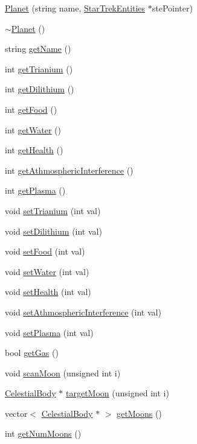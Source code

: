 \begin{DoxyCompactItemize}
\item 
\hyperlink{classPlanet_ac5a904c9d24bd4244ad72bb7ae3689f8}{Planet} (string name, \hyperlink{classStarTrekEntities}{StarTrekEntities} $\ast$stePointer)
\item 
\hyperlink{classPlanet_aaa1aaed9d4ef90b4836531edb7b18e0a}{$\sim$Planet} ()
\item 
string \hyperlink{classPlanet_a645b3d987a3001bac59a772b944607d2}{getName} ()
\item 
int \hyperlink{classPlanet_a37f64a787c17b5dd4471c8ad54fd9df0}{getTrianium} ()
\item 
int \hyperlink{classPlanet_a272240452921331e7220108df452a37d}{getDilithium} ()
\item 
int \hyperlink{classPlanet_a2b85fd628db9831d7ab5c7149b80cde3}{getFood} ()
\item 
int \hyperlink{classPlanet_af5bc4d184fcb72bd37f70119af5ecd89}{getWater} ()
\item 
int \hyperlink{classPlanet_a4499676225d09b0249cf225e795ce3cb}{getHealth} ()
\item 
int \hyperlink{classPlanet_a802c105bafd608a0ac57e8f03d2d2465}{getAthmosphericInterference} ()
\item 
int \hyperlink{classPlanet_ad7c07f51f9a447bf4aba45875e5f8e44}{getPlasma} ()
\item 
void \hyperlink{classPlanet_a298ae0e6344b5e83b4c53e5377b0531f}{setTrianium} (int val)
\item 
void \hyperlink{classPlanet_a780868e3c6275c2f8026bf7f7b910be1}{setDilithium} (int val)
\item 
void \hyperlink{classPlanet_a2f73c4ce9e4e4eb204b50413ea81d0cc}{setFood} (int val)
\item 
void \hyperlink{classPlanet_afbc0d813ae0d2a958487cfc2a06fd9d1}{setWater} (int val)
\item 
void \hyperlink{classPlanet_aa3ade00566dc836084395a25adc2cdb8}{setHealth} (int val)
\item 
void \hyperlink{classPlanet_a8f00e39da016ecdca4d1f0e7e8a76f5d}{setAthmosphericInterference} (int val)
\item 
void \hyperlink{classPlanet_a227e20f2716a12afddf50eddcd7c10c5}{setPlasma} (int val)
\item 
bool \hyperlink{classPlanet_a1b79060982d564661119fbae3d4a1726}{getGas} ()
\item 
void \hyperlink{classPlanet_ad039e19380947fbf2695d78d4059f1db}{scanMoon} (unsigned int i)
\item 
\hyperlink{classCelestialBody}{CelestialBody} $\ast$ \hyperlink{classPlanet_a86eb8c5701ace894c2ca47b80ae776e9}{targetMoon} (unsigned int i)
\item 
vector$<$ \hyperlink{classCelestialBody}{CelestialBody} $\ast$ $>$ \hyperlink{classPlanet_ac003f70ce4149dc5d87423dace7de0b1}{getMoons} ()
\item 
int \hyperlink{classPlanet_a4c5cc040f92ec9fde52a4cccd04b69ff}{getNumMoons} ()
\end{DoxyCompactItemize}


